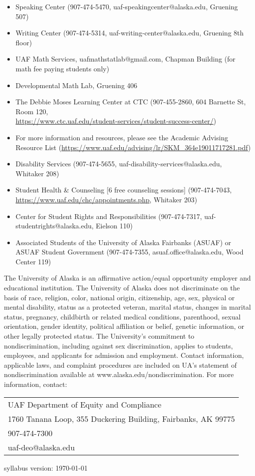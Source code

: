 \documentclass[12pt]{article}
\begin{document}
\begin{itemize}
\setlength\itemsep{0em}
        \item Speaking Center (907-474-5470,
        {uaf-speakingcenter@alaska.edu}, Gruening 507)
\item Writing Center (907-474-5314, {uaf-writing-center@alaska.edu}, Gruening 8th floor)
\item UAF Math Services, {uafmathstatlab@gmail.com}, Chapman Building (for math fee paying students only)
\item Developmental Math Lab, Gruening 406
\item The Debbie Moses Learning Center at CTC (907-455-2860, 604 Barnette St, Room 120,\\ \url{https://www.ctc.uaf.edu/student-services/student-success-center/})
\item For more information and resources, please see the Academic Advising Resource List (\url{https://www.uaf.edu/advising/lr/SKM_364e19011717281.pdf})
\end{itemize}

\begin{itemize}
\setlength\itemsep{0em}
\item Disability Services (907-474-5655, {uaf-disability-services@alaska.edu}, Whitaker 208)
\item Student Health \& Counseling [6 free counseling sessions] (907-474-7043, \url{https://www.uaf.edu/chc/appointments.php}, Whitaker 203)
\item Center for Student Rights and Responsibilities (907-474-7317, {uaf-studentrights@alaska.edu}, Eielson 110)
\item Associated Students of the University of Alaska Fairbanks (ASUAF) or ASUAF Student Government (907-474-7355, {asuaf.office@alaska.edu}, Wood Center 119)
\end{itemize}

The University of Alaska is an affirmative action/equal opportunity employer and educational institution. The University of Alaska does not discriminate on the basis of race, religion, color, national origin, citizenship, age, sex, physical or mental disability, status as a protected veteran, marital status, changes in marital status, pregnancy, childbirth or related medical conditions, parenthood, sexual orientation, gender identity, political affiliation or belief, genetic information, or other legally protected status. The University's commitment to nondiscrimination, including against sex discrimination, applies to students, employees, and applicants for admission and employment. Contact information, applicable laws, and complaint procedures are included on UA's statement of nondiscrimination available at www.alaska.edu/nondiscrimination. For more information, contact:

\begin{tabular}{l}
UAF Department of Equity and Compliance\\
1760 Tanana Loop, 355 Duckering Building, Fairbanks, AK  99775\\
907-474-7300\\
{uaf-deo@alaska.edu}
\end{tabular}

\hfill

 \scriptsize syllabus version: \today \normalsize
\end{document}
